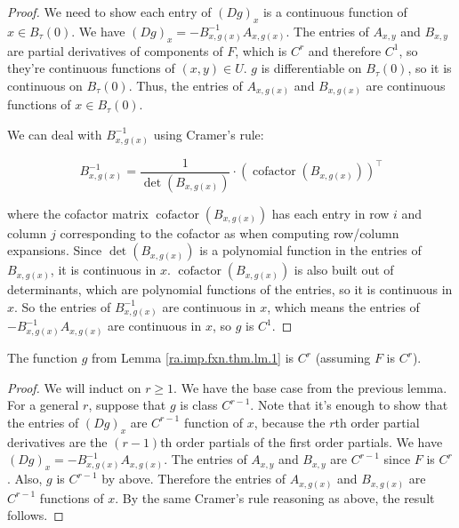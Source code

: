 \begin{proof}

We need to show each entry of \((Dg)_x\) is a continuous function of \(x \in B_\tau(0)\). We have \((Dg)_x = -B_{x, g(x)}^{-1} A_{x, g(x)}\). The entries of \(A_{x,y}\) and \(B_{x,y}\) are partial derivatives of components of \(F\), which is \(C^r\) and therefore \(C^1\), so they're continuous functions of \((x,y) \in U\). \(g\) is differentiable on \(B_\tau(0)\), so it is continuous on \(B_\tau(0)\). Thus, the entries of \(A_{x, g(x)}\) and \(B_{x, g(x)}\) are continuous functions of \(x \in B_\tau(0)\).

We can deal with \(B_{x,g(x)}^{-1}\) using Cramer's rule:

\[
B_{x,g(x)}^{-1} = \frac{1}{\operatorname{det}(B_{x,g(x)})} \cdot \left( \operatorname{cofactor}(B_{x, g(x)}) \right)^\top
\]

where the cofactor matrix \( \operatorname{cofactor}(B_{x, g(x)})\) has each entry in row \(i\) and column \(j\) corresponding to the cofactor as when computing row/column expansions. Since \(\operatorname{det}(B_{x,g(x)})\) is a polynomial function in the entries of \(B_{x,g(x)}\), it is continuous in \(x\). \( \operatorname{cofactor}(B_{x, g(x)})\) is also built out of determinants, which are polynomial functions of the entries, so it is continuous in \(x\). So the entries of \(B_{x,g(x)}^{-1} \) are continuous in \(x\), which means the entries of \(-B_{x, g(x)}^{-1} A_{x, g(x)}\) are continuous in \(x\), so \(g\) is \(C^1\).

\end{proof}

\begin{lemma}\label{ra.imp.fxn.thm.lm.2}

The function \(g\) from Lemma \ref{ra.imp.fxn.thm.lm.1} is \(C^r\) (assuming \(F\) is \(C^r\)).

\end{lemma}

\begin{proof}

We will induct on \(r \geq 1\). We have the base case from the previous lemma. For a general \(r\), suppose that \(g\) is class \(C^{r-1}\). Note that it's enough to show that the entries of \((Dg)_x\) are \(C^{r-1}\) function of \(x\), because the \(r\)th order partial derivatives are the \((r-1)\)th order partials of the first order partials. We have \((Dg)_x = - B^{-1}_{x, g(x)} A_{x, g(x)}\). The entries of \(A_{x,y}\) and \(B_{x,y}\) are \(C^{r-1}\) since \(F\) is \(
C^r\). Also, \(g\) is \(C^{r-1}\) by above. Therefore the entries of \(A_{x,g(x)}\) and \(B_{x,g(x)}\) are \(C^{r-1}\) functions of \(x\). By the same Cramer's rule reasoning as above, the result follows.

\end{proof}

